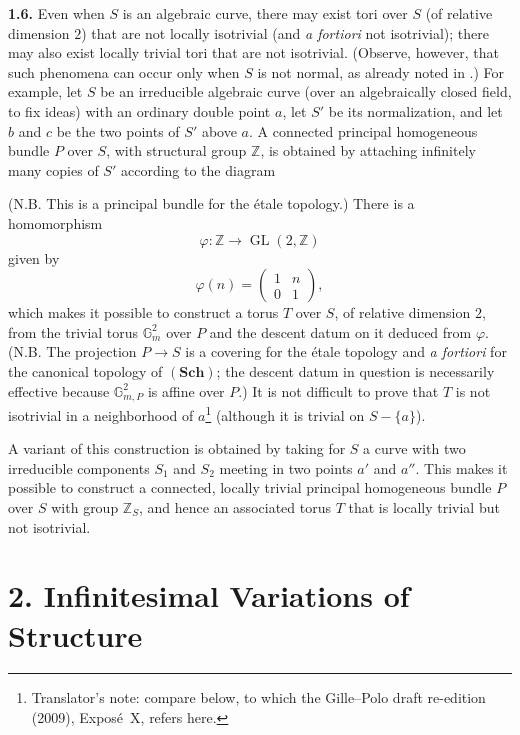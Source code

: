 \medskip
\noindent{}\textbf{1.6.}
Even when \(S\) is an algebraic curve, there may exist tori over \(S\)
(of relative dimension \(2\)) that are not locally isotrivial (and
\emph{a fortiori} not isotrivial); there may also exist locally
trivial tori that are not isotrivial. (Observe, however, that such
phenomena can occur only when \(S\) is not normal, as already noted in
.) For example, let \(S\) be an irreducible algebraic curve (over
an algebraically closed field, to fix ideas) with an ordinary double
point \(a\), let \(S'\) be its normalization, and let \(b\) and \(c\)
be the two points of \(S'\) above \(a\). A connected principal
homogeneous bundle \(P\) over \(S\), with structural group
\(\mathbb Z\), is obtained by attaching infinitely many copies of
\(S'\) according to the diagram
\begin{center}
  
\end{center}
(N.B. This is a principal bundle for the étale topology.) There is a
homomorphism
\[
  \varphi:\mathbb Z\longrightarrow\operatorname{GL}(2,\mathbb Z)
\]
given by
\[
  \varphi(n)=
  \begin{pmatrix}
    1 & n\\
    0 & 1
  \end{pmatrix},
\]
which makes it possible to construct a torus \(T\) over \(S\), of
relative dimension \(2\), from the trivial torus \(\mathbb G_m^2\)
over \(P\) and the descent datum on it deduced from \(\varphi\).
(N.B. The projection \(P\to S\) is a covering for the étale topology
and \emph{a fortiori} for the canonical topology of
\((\mathbf{Sch})\); the descent datum in question is necessarily
effective because \(\mathbb G_{m,P}^2\) is affine over \(P\).) It is
not difficult to prove that \(T\) is not isotrivial in a neighborhood
of \(a\)\footnote{Translator's note: compare
 below, to which the Gille--Polo draft
re-edition (2009), Expos\'e~X, refers here.} (although it is
trivial on \(S-\{a\}\)).

A variant of this construction is obtained by taking for \(S\) a
curve with two irreducible components \(S_1\) and \(S_2\) meeting in
two points \(a'\) and \(a''\). This makes it possible to construct a
connected, locally trivial principal homogeneous bundle \(P\) over
\(S\) with group \(\mathbb Z_S\), and hence an associated torus \(T\)
that is locally trivial but not isotrivial.

\section*{2. Infinitesimal Variations of
Structure}

